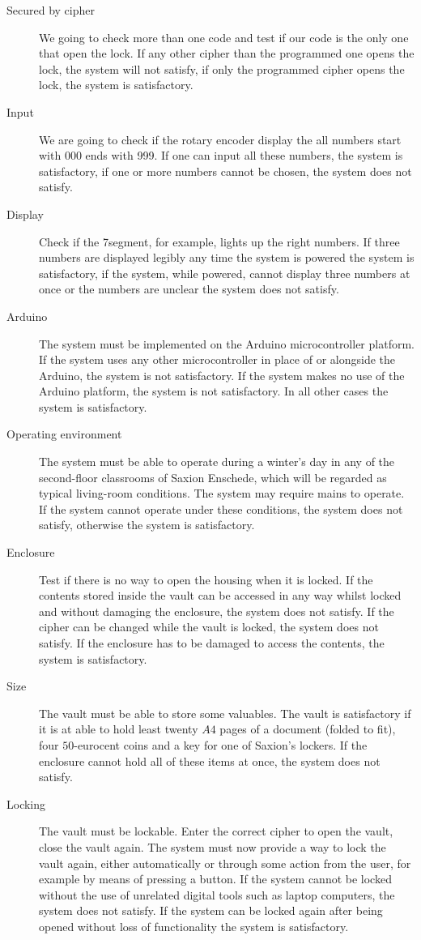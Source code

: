\documentclass[oneside,a4paper,11pt,titlepage,openany]{report}
\begin{document}
\begin{description}
\item[Secured by cipher] We going to check more than one code and test if our code is the only one that open the lock. If any other cipher than the programmed one opens the lock, the system will not satisfy, if only the programmed cipher opens the lock, the system is satisfactory.
\item[Input] We are going to check if the rotary encoder display the all numbers start with 000 ends with 999. If one can input all these numbers, the system is satisfactory, if one or more numbers cannot be chosen, the system does not satisfy.
\item[Display] Check if the 7segment, for example, lights up the right numbers. If three numbers are displayed legibly any time the system is powered the system is satisfactory, if the system, while powered, cannot display three numbers at once or the numbers are unclear the system does not satisfy.
\item[Arduino]The system must be implemented on the Arduino microcontroller platform. If the system uses any other microcontroller in place of or alongside the Arduino, the system is not satisfactory. If the system makes no use of the Arduino platform, the system is not satisfactory. In all other cases the system is satisfactory.
\item[Operating environment]The system must be able to operate during a winter's day in any of the second-floor classrooms of Saxion Enschede, which will be regarded as typical living-room conditions. The system may require mains to operate. If the system cannot operate under these conditions, the system does not satisfy, otherwise the system is satisfactory.
\item[Enclosure] Test if there is no way to open the housing when it is locked. If the contents stored inside the vault can be accessed in any way whilst locked and without damaging the enclosure, the system does not satisfy. If the cipher can be changed while the vault is locked, the system does not satisfy. If the enclosure has to be damaged to access the contents, the system is satisfactory.
\item[Size]The vault must be able to store some valuables. The vault is satisfactory if it is at able to hold least twenty $A4$ pages of a document (folded to fit), four $50$-eurocent coins and a key for one of Saxion's lockers. If the enclosure cannot hold all of these items at once, the system does not satisfy.
\item[Locking] The vault must be lockable. Enter the correct cipher to open the vault, close the vault again. The system must now provide a way to lock the vault again, either automatically or through some action from the user, for example by means of pressing a button. If the system cannot be locked without the use of unrelated digital tools such as laptop computers, the system does not satisfy. If the system can be locked again after being opened without loss of functionality the system is satisfactory.

\end{description}
\end{document}
